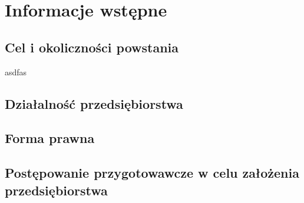 \section{Informacje wstępne}
\subsection{Cel i okoliczności powstania}
asdfas
\subsection{Działalność przedsiębiorstwa}
\subsection{Forma prawna}
\subsection{Postępowanie przygotowawcze w celu założenia przedsiębiorstwa}